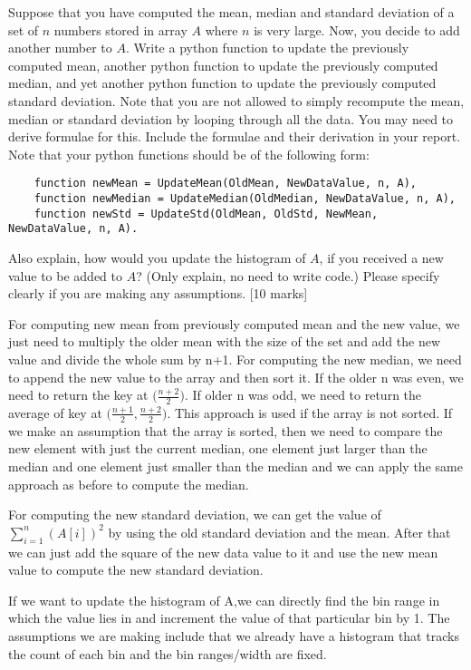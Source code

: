 \begin{que}
	Suppose that you have computed the mean, median and standard deviation of a
	set of $n$ numbers stored in array $A$ where $n$ is very large. Now, you decide
	to add another number to $A$. Write a python function to update the
	previously computed mean, another python function to update the previously
	computed median, and yet another python function to update the previously
	computed standard deviation. Note that you are not allowed to simply
	recompute the mean, median or standard deviation by looping through all the
	data. You may need to derive formulae for this. Include the formulae and
	their derivation in your report. Note that your python functions should be
	of the following form:

	\begin{verbatim}
	function newMean = UpdateMean(OldMean, NewDataValue, n, A),
	function newMedian = UpdateMedian(OldMedian, NewDataValue, n, A),
	function newStd = UpdateStd(OldMean, OldStd, NewMean, NewDataValue, n, A).
	\end{verbatim}

	Also explain, how would you update the histogram of $A$, if you received
	a new value to be added to $A$? (Only explain, no need to write code.)
	Please specify clearly if you are making any assumptions.
	\hspace*{\fill}[10 marks]
\end{que}

\begin{tcolorbox}
	\begin{sol}
		For computing new mean from previously computed mean and the new value, we just need to multiply the older mean with the size of the set and add the new value and divide the whole sum by n+1. For computing the new median, we need to append the new value to the array and then sort it. If the older n was even, we need to return the key at $\big(\frac{n+2}{2}\big)$. If older n was odd, we need to return the average of key at $\big(\frac{n+1}{2},\frac{n+2}{2}\big)$. This approach is used if the array is not sorted. If we make an assumption that the array is sorted, then we need to compare the new element with just the current median, one element just larger than the median and one element just smaller than the median and we can apply the same approach as before to compute the median. 
  \par For computing the new standard deviation, we can get the value of $\sum_{i=1}^{n}(A[i])^2$ by using the old standard deviation and the mean. After that we can just add the square of the new data value to it and use the new mean value to compute the new standard deviation.
  \par If we want to update the histogram of A,we can directly find the bin range in which the value lies in and increment the value of that particular bin by 1.
  The assumptions we are making include that we already have a histogram that tracks the count of each bin and the bin ranges/width are fixed.
	\end{sol}
\end{tcolorbox}
